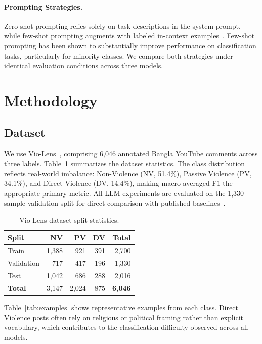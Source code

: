 \documentclass[sigconf,nonacm]{acmart}
\begin{document}
\paragraph{Prompting Strategies.}
Zero-shot prompting relies solely on task descriptions in the system prompt, while few-shot prompting augments with labeled in-context examples~\cite{brown2020}. Few-shot prompting has been shown to substantially improve performance on classification tasks, particularly for minority classes. We compare both strategies under identical evaluation conditions across three models.

\section{Methodology}

\subsection{Dataset}

We use Vio-Lens~\cite{violens}, comprising 6,046 annotated Bangla YouTube comments across three labels. Table~\ref{tab:dataset} summarizes the dataset statistics. The class distribution reflects real-world imbalance: Non-Violence (NV, 51.4\%), Passive Violence (PV, 34.1\%), and Direct Violence (DV, 14.4\%), making macro-averaged F1 the appropriate primary metric. All LLM experiments are evaluated on the 1,330-sample validation split for direct comparison with published baselines~\cite{violens}.

\begin{table}[t]
\caption{Vio-Lens dataset split statistics.}
\label{tab:dataset}
\setlength{\tabcolsep}{5pt}
\begin{tabular}{lrrrr}
\toprule
\textbf{Split} & \textbf{NV} & \textbf{PV} & \textbf{DV} & \textbf{Total} \\
\midrule
Train      & 1,388 & 921  & 391 & 2,700 \\
Validation & 717   & 417  & 196 & 1,330 \\
Test       & 1,042 & 686  & 288 & 2,016 \\
\midrule
\textbf{Total} & 3,147 & 2,024 & 875 & \textbf{6,046} \\
\bottomrule
\end{tabular}
\end{table}

Table~\ref{tab:examples} shows representative examples from each class. Direct Violence posts often rely on religious or political framing rather than explicit vocabulary, which contributes to the classification difficulty observed across all models.
\end{document}
